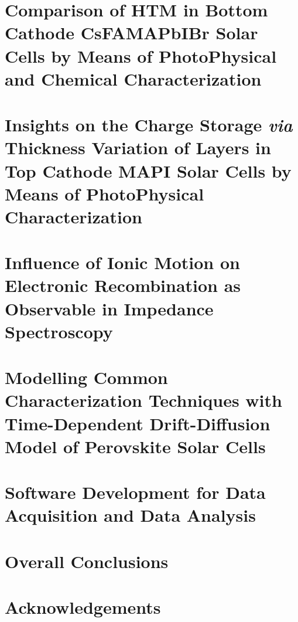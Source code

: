 \documentclass[b5paper, 12pt, openright]{book} %
\begin{document}
\chapter{Comparison of HTM in Bottom Cathode CsFAMAPbIBr Solar Cells by Means of PhotoPhysical and Chemical Characterization}\label{ch:tae}
	\graphicspath{ {./contents_img/tae/} }

\chapter{Insights on the Charge Storage \textit{via} Thickness Variation of Layers in Top Cathode MAPI Solar Cells by Means of PhotoPhysical Characterization}\label{ch:thicknesses}
	\graphicspath{ {./contents_img/thicknesses/} }

\chapter{Influence of Ionic Motion on Electronic Recombination as Observable in Impedance Spectroscopy}\label{ch:impedance}
	\graphicspath{ {./contents_img/impedance/} }

\chapter{Modelling Common Characterization Techniques with Time-Dependent Drift-Diffusion Model of Perovskite Solar Cells}\label{ch:modelling}
	\graphicspath{ {./contents_img/modelling/} }

\chapter{Software Development for Data Acquisition and Data Analysis}\label{ch:software}
	\graphicspath{ {./contents_img/software/} }

\chapter*{Overall Conclusions}\label{ch:conclusions}

\chapter*{Acknowledgements}
\end{document}
